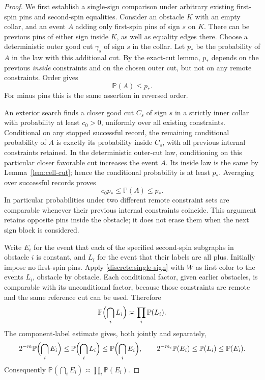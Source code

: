 \documentclass[11pt]{article}
\theoremstyle{definition}
\theoremstyle{remark}
\numberwithin{equation}{section}
\begin{document}
\begin{proof}
We first establish a single-sign comparison under arbitrary existing
first-spin pins and second-spin equalities. Consider an obstacle $K$
with an empty collar, and an event $A$ adding only first-spin pins of
sign $s$ on $K$. There can be previous pins of either sign inside $K$,
as well as equality edges there. Choose a deterministic outer good cut
$\gamma_s$ of sign $s$ in the collar. Let $p_*$ be the probability of
$A$ in the law with this additional cut. By the exact-cut lemma, $p_*$
depends on the previous \emph{inside} constraints and on the chosen
outer cut, but not on any remote constraints. Order gives
\begin{equation}\label{discrete:pstar}
 \mathbb P(A)\le p_*.
\end{equation}
For minus pins this is the same assertion in reversed order.

An exterior search finds a closer good cut $C_s$ of sign $s$ in a
strictly inner collar with probability at least $c_0>0$, uniformly over
all existing constraints. Conditional on any stopped successful record,
the remaining conditional probability of $A$ is exactly its probability
inside $C_s$, with all previous internal constraints retained. In the
deterministic outer-cut law, conditioning on this particular closer
favorable cut increases the event $A$. Its inside law is the same by
Lemma~\ref{lem:cell-cut}; hence the conditional probability is at least
$p_*$. Averaging over successful records proves
\begin{equation}\label{discrete:single-sign}
 c_0p_*\le\mathbb P(A)\le p_*.
\end{equation}
In particular probabilities under two different remote constraint sets
are comparable whenever their previous internal constraints coincide.
This argument retains opposite pins inside the obstacle; it does not
erase them when the next sign block is considered.

Write $E_i$ for the event that each of the specified second-spin
subgraphs in obstacle $i$ is constant, and $L_i$ for the event that their
labels are all plus. Initially impose no first-spin pins. Apply
\eqref{discrete:single-sign} with $W$ as first color to the events $L_i$,
obstacle by obstacle. Each conditional factor, given earlier obstacles,
is comparable with its unconditional factor, because those constraints
are remote and the same reference cut can be used. Therefore
\[
 \mathbb P\Bigl(\bigcap_i L_i\Bigr)\asymp\prod_i\mathbb P(L_i).
\]
The component-label estimate gives, both jointly and separately,
\[
 2^{-m}\mathbb P\Bigl(\bigcap_i E_i\Bigr)
 \le\mathbb P\Bigl(\bigcap_i L_i\Bigr)
 \le\mathbb P\Bigl(\bigcap_i E_i\Bigr),\qquad
 2^{-m_i}\mathbb P(E_i)\le\mathbb P(L_i)\le\mathbb P(E_i).
\]
Consequently $\mathbb P(\bigcap_iE_i)\asymp\prod_i\mathbb P(E_i)$.


\end{proof}
\end{document}
